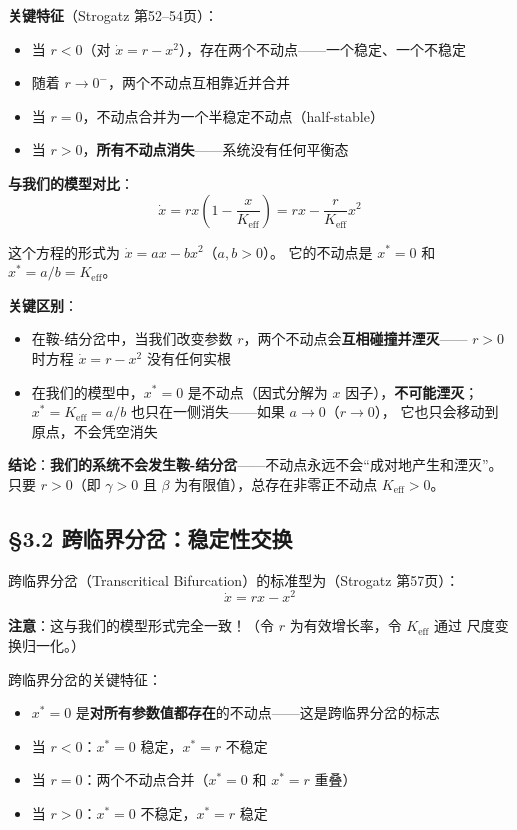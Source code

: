 \documentclass[12pt,a4paper]{article}
\begin{document}
\textbf{关键特征}（Strogatz 第52--54页）：
\begin{itemize}
  \item 当 $r < 0$（对 $\dot{x} = r - x^2$），存在两个不动点——一个稳定、一个不稳定
  \item 随着 $r \to 0^-$，两个不动点互相靠近并合并
  \item 当 $r = 0$，不动点合并为一个半稳定不动点（half-stable）
  \item 当 $r > 0$，\textbf{所有不动点消失}——系统没有任何平衡态
\end{itemize}

\textbf{与我们的模型对比}：
\begin{equation}
\dot{x} = r x \left(1 - \frac{x}{K_{\text{eff}}}\right)
       = r x - \frac{r}{K_{\text{eff}}} x^2
\end{equation}

这个方程的形式为 $\dot{x} = a x - b x^2$（$a, b > 0$）。
它的不动点是 $x^* = 0$ 和 $x^* = a/b = K_{\text{eff}}$。

\textbf{关键区别}：
\begin{itemize}
  \item 在鞍-结分岔中，当我们改变参数 $r$，两个不动点会\textbf{互相碰撞并湮灭}——
        $r > 0$ 时方程 $\dot{x} = r - x^2$ 没有任何实根
  \item 在我们的模型中，$x^* = 0$ 是不动点（因式分解为 $x$ 因子），\textbf{不可能湮灭}；
        $x^* = K_{\text{eff}} = a/b$ 也只在一侧消失——如果 $a \to 0$（$r \to 0$），
        它也只会移动到原点，不会凭空消失
\end{itemize}

\textbf{结论}：\textbf{我们的系统不会发生鞍-结分岔}——不动点永远不会``成对地产生和湮灭''。
只要 $r > 0$（即 $\gamma > 0$ 且 $\beta$ 为有限值），总存在非零正不动点 $K_{\text{eff}} > 0$。

\subsection{\S3.2 跨临界分岔：稳定性交换}

跨临界分岔（Transcritical Bifurcation）的标准型为（Strogatz 第57页）：
\begin{equation}
\dot{x} = r x - x^2
\end{equation}

\textbf{注意}：这与我们的模型形式完全一致！（令 $r$ 为有效增长率，令 $K_{\text{eff}}$ 通过
尺度变换归一化。）

跨临界分岔的关键特征：
\begin{itemize}
  \item $x^* = 0$ 是\textbf{对所有参数值都存在}的不动点——这是跨临界分岔的标志
  \item 当 $r < 0$：$x^* = 0$ 稳定，$x^* = r$ 不稳定
  \item 当 $r = 0$：两个不动点合并（$x^* = 0$ 和 $x^* = r$ 重叠）
  \item 当 $r > 0$：$x^* = 0$ 不稳定，$x^* = r$ 稳定
\end{itemize}
\end{document}
